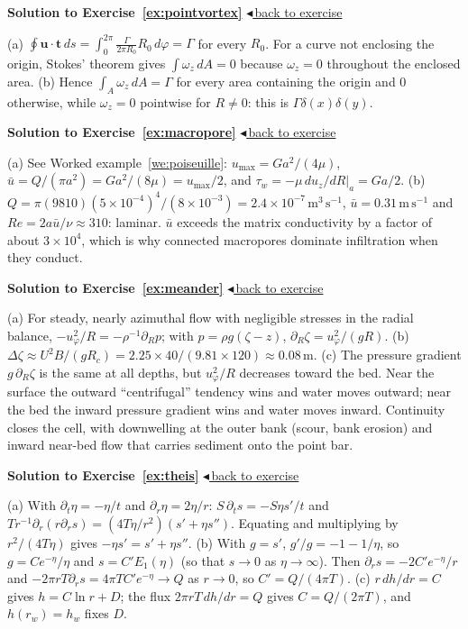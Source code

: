 \documentclass[11pt,letterpaper]{article}
\numberwithin{equation}{section}
\newcommand{\uu}{\mathbf{u}}
\newcommand{\tv}{\mathbf{t}}
\newcommand{\units}[1]{\,\mathrm{#1}}
\newenvironment{solution}[1]{%
  \par\addvspace{1.0ex}\noindent\phantomsection\label{sol:#1}%
  {\color{exorange!85!black}\bfseries Solution to Exercise~\ref{ex:#1}}%
  \hfill\hyperref[ex:#1]{\small$\blacktriangleleft$\,back to exercise}\par\nopagebreak\smallskip}%
  {\par\smallskip\noindent{\color{exorange!40}\rule{\linewidth}{0.4pt}}\par}
\begin{document}
\begin{solution}{pointvortex}
(a) $\oint\uu\cdot\tv\,ds=\int_0^{2\pi}\frac{\Gamma}{2\pi R_0}R_0\,d\varphi=\Gamma$ for every $R_0$. For a curve not enclosing the origin, Stokes' theorem gives
$\int\omega_z\,dA=0$ because $\omega_z=0$ throughout the enclosed area.
(b) Hence $\int_A\omega_z\,dA=\Gamma$ for every area containing the origin and $0$ otherwise, while $\omega_z=0$ pointwise for $R\neq0$: this is $\Gamma\delta(x)\delta(y)$.
\end{solution}

\begin{solution}{macropore}
(a) See Worked example~\ref{we:poiseuille}: $u_{\max}=Ga^2/(4\mu)$, $\bar u=Q/(\pi a^2)=Ga^2/(8\mu)=u_{\max}/2$, and $\tau_w=-\mu\,du_z/dR|_{a}=Ga/2$.
(b) $Q=\pi(9810)(5\times10^{-4})^4/(8\times10^{-3})=2.4\times10^{-7}\units{m^3\,s^{-1}}$, $\bar u=0.31\units{m\,s^{-1}}$ and $Re=2a\bar u/\nu\approx310$: laminar.
$\bar u$ exceeds the matrix conductivity by a factor of about $3\times10^4$, which is why connected macropores dominate infiltration when they conduct.
\end{solution}

\begin{solution}{meander}
(a) For steady, nearly azimuthal flow with negligible stresses in the radial balance, $-u_\varphi^2/R=-\rho^{-1}\partial_Rp$; with $p=\rho g(\zeta-z)$,
$\partial_R\zeta=u_\varphi^2/(gR)$.
(b) $\Delta\zeta\approx U^2B/(gR_c)=2.25\times40/(9.81\times120)\approx0.08\units{m}$.
(c) The pressure gradient $g\,\partial_R\zeta$ is the same at all depths, but $u_\varphi^2/R$ decreases toward the bed. Near the surface the outward ``centrifugal''
tendency wins and water moves outward; near the bed the inward pressure gradient wins and water moves inward. Continuity closes the cell, with
downwelling at the outer bank (scour, bank erosion) and inward near-bed flow that carries sediment onto the point bar.
\end{solution}

\begin{solution}{theis}
(a) With $\partial_t\eta=-\eta/t$ and $\partial_r\eta=2\eta/r$: $S\,\partial_ts=-S\eta s'/t$ and $T r^{-1}\partial_r(r\partial_rs)=(4T\eta/r^2)(s'+\eta s'')$. Equating and multiplying
by $r^2/(4T\eta)$ gives $-\eta s'=s'+\eta s''$.
(b) With $g=s'$, $g'/g=-1-1/\eta$, so $g=Ce^{-\eta}/\eta$ and $s=C'E_1(\eta)$ (so that $s\to0$ as $\eta\to\infty$). Then $\partial_rs=-2C'e^{-\eta}/r$ and
$-2\pi rT\partial_rs=4\pi TC'e^{-\eta}\to Q$ as $r\to0$, so $C'=Q/(4\pi T)$.
(c) $r\,dh/dr=C$ gives $h=C\ln r+D$; the flux $2\pi rT\,dh/dr=Q$ gives $C=Q/(2\pi T)$, and $h(r_w)=h_w$ fixes $D$.
\end{solution}
\end{document}
